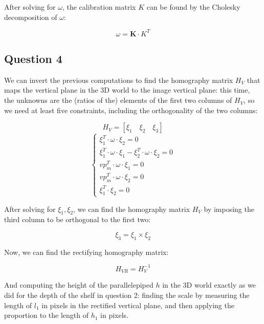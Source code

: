 \documentclass[a4paper, 11pt, oneside, openright, english]{article}
\begin{document}
After solving for $\omega$, the calibration matrix $K$ can be found by the Cholesky decomposition of $\omega$:

\begin{equation}
    \omega = \mathbf{K} \cdot K^T
\end{equation}

\subsection{Question 4}

We can invert the previous computations to find the homography matrix $H_V$ that maps the vertical plane in the 3D world to the image vertical plane: this time, the unknowns are the (ratios of the) elements of the first two columns of $H_V$, so we need at least five constraints, including the orthogonality of the two columns:

\begin{equation*}
    H_V = [\xi_1 \quad \xi_2 \quad \xi_3]
\end{equation*}
\begin{equation}
    \begin{cases}
        \xi_1^T \cdot \omega \cdot \xi_2 = 0                                    \\
        \xi_1^T \cdot \omega \cdot \xi_1 - \xi_2^T \cdot \omega \cdot \xi_2 = 0 \\
        vp_m^T \cdot \omega \cdot \xi_1 = 0                                     \\
        vp_m^T \cdot \omega \cdot \xi_2 = 0                                     \\
        \xi_1^T \cdot \xi_2 = 0
    \end{cases}
\end{equation}

After solving for $\xi_1, \xi_2$, we can find the homography matrix $H_V$ by imposing the third column to be orthogonal to the first two:

\begin{equation}
    \xi_3 = \xi_1 \times \xi_2
\end{equation}

Now, we can find the rectifying homography matrix:

\begin{equation}
    H_{VR} = H_V^{-1}
\end{equation}

And computing the height of the parallelepiped $h$ in the 3D world exactly as we did for the depth of the shelf in question 2: finding the scale by measuring the length of $l_1$ in pixels in the rectified vertical plane, and then applying the proportion to the length of $h_1$ in pixels.
\end{document}
